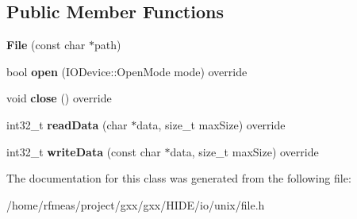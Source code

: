 \subsection*{Public Member Functions}
\begin{DoxyCompactItemize}
\item 
{\bfseries File} (const char $\ast$path)\hypertarget{classgxx_1_1unix_1_1File_a01670a8933f5d450c1edece6ee8838d1}{}\label{classgxx_1_1unix_1_1File_a01670a8933f5d450c1edece6ee8838d1}

\item 
bool {\bfseries open} (I\+O\+Device\+::\+Open\+Mode mode) override\hypertarget{classgxx_1_1unix_1_1File_af9461e66b78ca06bf9e3c78d70401ec9}{}\label{classgxx_1_1unix_1_1File_af9461e66b78ca06bf9e3c78d70401ec9}

\item 
void {\bfseries close} () override\hypertarget{classgxx_1_1unix_1_1File_a1c2e09c23ea1faa125f02f76cfd73c7e}{}\label{classgxx_1_1unix_1_1File_a1c2e09c23ea1faa125f02f76cfd73c7e}

\item 
int32\+\_\+t {\bfseries read\+Data} (char $\ast$data, size\+\_\+t max\+Size) override\hypertarget{classgxx_1_1unix_1_1File_abb16d4d949f169e0c447893882d4379a}{}\label{classgxx_1_1unix_1_1File_abb16d4d949f169e0c447893882d4379a}

\item 
int32\+\_\+t {\bfseries write\+Data} (const char $\ast$data, size\+\_\+t max\+Size) override\hypertarget{classgxx_1_1unix_1_1File_a68ab127b61f040ea437c238e7ee7eb91}{}\label{classgxx_1_1unix_1_1File_a68ab127b61f040ea437c238e7ee7eb91}

\end{DoxyCompactItemize}


The documentation for this class was generated from the following file\+:\begin{DoxyCompactItemize}
\item 
/home/rfmeas/project/gxx/gxx/\+H\+I\+D\+E/io/unix/file.\+h\end{DoxyCompactItemize}
